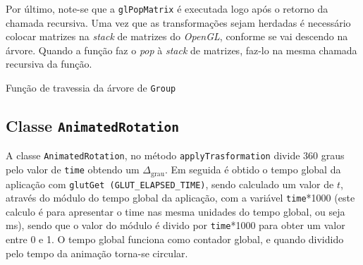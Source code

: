 Por último, note-se que a \texttt{glPopMatrix} é executada logo após o retorno
da chamada recursiva. Uma vez que as transformações sejam herdadas é necessário
colocar matrizes na \emph{stack} de matrizes do \emph{OpenGL}, conforme se vai
descendo na árvore. Quando a função faz o \emph{pop} à \emph{stack} de matrizes,
faz-lo na mesma chamada recursiva da função.

\newpage

\begin{algorithm}
\caption{Função de travessia da árvore de \texttt{Group}}
\label{alg:ssec2:traverse} 
\footnotesize %
\begin{algorithmic}[1]



 
 
\EndFor{}







\EndWhile{}

\EndProcedure{}

\end{algorithmic}
\end{algorithm}

\subsection{Classe \texttt{AnimatedRotation}}

A classe \texttt{AnimatedRotation}, no método \texttt{applyTrasformation}
divide 360 graus pelo valor de \texttt{time} obtendo um $\Delta_{\text{grau}}$.
Em seguida é obtido o tempo global da aplicação com
\texttt{glutGet (GLUT\_ELAPSED\_TIME)}, sendo calculado um valor de $t$, através
do módulo do tempo global da aplicação, com a variável \texttt{time}*1000 (este
calculo é para apresentar o time nas mesma unidades do tempo global, ou seja
ms), sendo que o valor do módulo é divido por \texttt{time}*1000 para obter um
valor entre 0 e 1. O tempo global funciona como contador global, e quando
dividido pelo tempo da animação torna-se circular.

